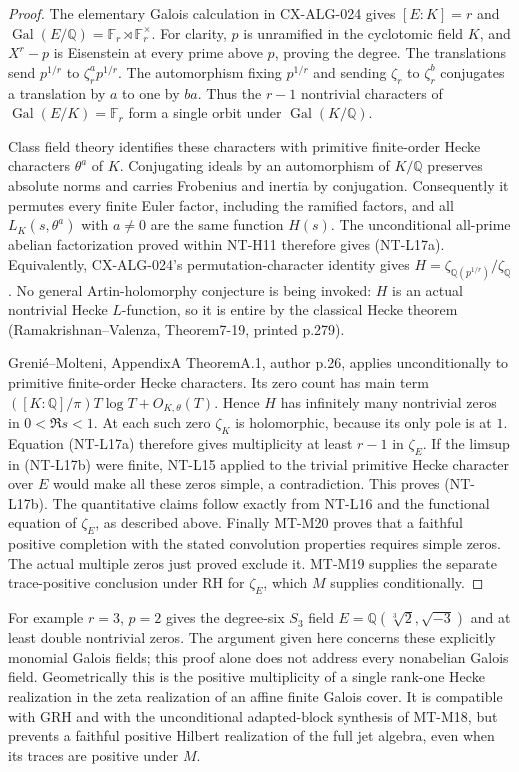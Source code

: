 \documentclass[11pt,a4paper]{article}
\begin{document}
\begin{proof}
The elementary Galois calculation in CX-ALG-024 gives
$[E:K]=r$ and
$\operatorname{Gal}(E/\mathbb Q)=\mathbb F_r\rtimes\mathbb F_r^\times$.
For clarity, $p$ is unramified in the cyclotomic field $K$, and
$X^r-p$ is Eisenstein at every prime above $p$, proving the degree.
The translations send $p^{1/r}$ to $\zeta_r^a p^{1/r}$.
The automorphism fixing $p^{1/r}$ and sending $\zeta_r$ to
$\zeta_r^b$ conjugates a translation by $a$ to one by $ba$.
Thus the $r-1$ nontrivial characters of
$\operatorname{Gal}(E/K)=\mathbb F_r$ form a single orbit under
$\operatorname{Gal}(K/\mathbb Q)$.

Class field theory identifies these characters with primitive
finite-order Hecke characters $\theta^a$ of $K$.
Conjugating ideals by an automorphism of $K/\mathbb Q$ preserves
absolute norms and carries Frobenius and inertia by conjugation.
Consequently it permutes every finite Euler factor, including the
ramified factors, and all $L_K(s,\theta^a)$ with $a\ne0$ are the
same function $H(s)$. The unconditional all-prime abelian factorization
proved within NT-H11 therefore gives (NT-L17a).
Equivalently, CX-ALG-024's permutation-character identity gives
$H=\zeta_{\mathbb Q(p^{1/r})}/\zeta_{\mathbb Q}$.
No general Artin-holomorphy conjecture is being invoked: $H$ is an
actual nontrivial Hecke $L$-function, so it is entire by the classical
Hecke theorem (Ramakrishnan--Valenza, Theorem7-19, printed p.279).

Greni\'e--Molteni, AppendixA TheoremA.1, author p.26, applies
unconditionally to primitive finite-order Hecke characters. Its
zero count has main term
$([K:\mathbb Q]/\pi)T\log T+O_{K,\theta}(T)$.
Hence $H$ has infinitely many nontrivial zeros in $0<\Re s<1$.
At each such zero $\zeta_K$ is holomorphic, because its only pole
is at $1$. Equation (NT-L17a) therefore gives multiplicity at
least $r-1$ in $\zeta_E$.
If the limsup in (NT-L17b) were finite, NT-L15 applied to the
trivial primitive Hecke character over $E$ would make all these
zeros simple, a contradiction. This proves (NT-L17b).
The quantitative claims follow exactly from NT-L16 and the
functional equation of $\zeta_E$, as described above.
Finally MT-M20 proves that a faithful positive completion with the
stated convolution properties requires simple zeros. The actual
multiple zeros just proved exclude it. MT-M19 supplies the separate
trace-positive conclusion under RH for $\zeta_E$, which $M$ supplies
conditionally.
\end{proof}
For example $r=3$, $p=2$ gives the degree-six $S_3$ field
$E=\mathbb Q(\sqrt[3]{2},\sqrt{-3})$ and at least double nontrivial
zeros. The argument given here concerns these explicitly monomial
Galois fields; this proof alone does not address every nonabelian
Galois field.
Geometrically this is the positive multiplicity of a single
rank-one Hecke realization in the zeta realization of an affine
finite Galois cover. It is compatible with GRH and with the
unconditional adapted-block synthesis of MT-M18, but prevents
a faithful positive Hilbert realization of the full jet algebra,
even when its traces are positive under $M$.
\end{document}
